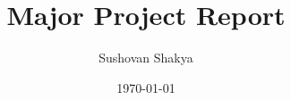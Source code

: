 \documentclass[12pt]{article}
\title{Major Project Report}
\author{Sushovan Shakya}
\date{\today}
\begin{document}










\newpage
{
  \setlength{\parskip}{0em}
  \renewcommand\contentsname{TABLE OF CONTENTS} %
  \tableofcontents %
}

\newpage





 

\end{document}
